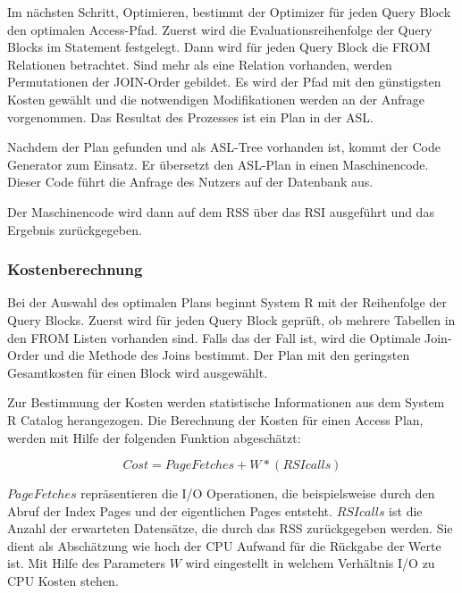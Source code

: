 Im nächsten Schritt, Optimieren, bestimmt der Optimizer für jeden Query Block den optimalen Access-Pfad. Zuerst wird die Evaluationsreihenfolge der Query Blocks im Statement festgelegt. Dann wird für jeden Query Block die FROM Relationen betrachtet. Sind mehr als eine Relation vorhanden, werden Permutationen der JOIN-Order gebildet. Es wird der Pfad mit den günstigsten Kosten gewählt und die notwendigen Modifikationen werden an der Anfrage vorgenommen. Das Resultat des Prozesses ist ein Plan in der \ac{ASL}.

Nachdem der Plan gefunden und als \ac{ASL}-Tree vorhanden ist, kommt der Code Generator zum Einsatz. Er übersetzt den \ac{ASL}-Plan in einen  Maschinencode. Dieser Code führt die Anfrage des Nutzers auf der Datenbank aus. 

Der Maschinencode wird dann auf dem \ac{RSS} über das \ac{RSI} ausgeführt und das Ergebnis zurückgegeben.

\subsubsection{Kostenberechnung}
\label{sec:SystemRKostenberechnung}
Bei der Auswahl des optimalen Plans beginnt System R mit der Reihenfolge der Query Blocks. Zuerst wird für jeden Query Block geprüft, ob mehrere Tabellen in den FROM Listen vorhanden sind. Falls das der Fall ist, wird die Optimale Join-Order und die Methode des Joins bestimmt. Der Plan mit den geringsten Gesamtkosten für einen Block wird ausgewählt.

Zur Bestimmung der Kosten werden statistische Informationen aus dem System R Catalog herangezogen. Die Berechnung der Kosten für einen Access Plan, werden mit Hilfe der folgenden Funktion abgeschätzt:

$$Cost = Page Fetches + W * (RSI calls)$$


$Page Fetches$ repräsentieren die I/O Operationen, die beispielsweise durch den Abruf der Index Pages und der eigentlichen Pages entsteht. $RSI calls$ ist die Anzahl der erwarteten Datensätze, die durch das \ac{RSS} zurückgegeben werden. Sie dient als Abschätzung wie hoch der CPU Aufwand für die Rückgabe der Werte ist. Mit Hilfe des Parameters $W$ wird eingestellt in welchem Verhältnis I/O zu CPU Kosten stehen.




